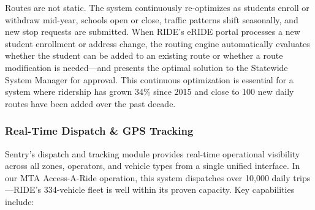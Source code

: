 \begin{description}[style=nextline, leftmargin=0.5cm]
    \item[\faIcon{sync} \textbf{Continuous Optimization:}] Routes are not static. The system continuously re-optimizes as students enroll or withdraw mid-year, schools open or close, traffic patterns shift seasonally, and new stop requests are submitted. When RIDE's eRIDE portal processes a new student enrollment or address change, the routing engine automatically evaluates whether the student can be added to an existing route or whether a route modification is needed---and presents the optimal solution to the Statewide System Manager for approval. This continuous optimization is essential for a system where ridership has grown 34\% since 2015 and close to 100 new daily routes have been added over the past decade.
\end{description}

\subsubsection{Real-Time Dispatch \& GPS Tracking}

Sentry's dispatch and tracking module provides real-time operational visibility across all zones, operators, and vehicle types from a single unified interface. In our MTA Access-A-Ride operation, this system dispatches over 10,000 daily trips---RIDE's 334-vehicle fleet is well within its proven capacity. Key capabilities include:

